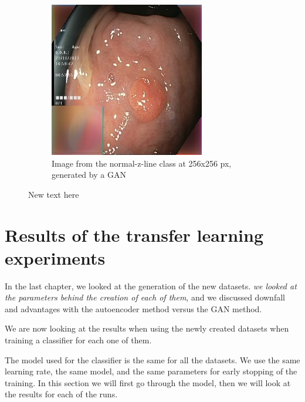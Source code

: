 \begin{figure}[t]
\begin{subfigure}[b]{0.4\textwidth}
            \includegraphics[width=\textwidth]{experiments/figures/both/greenGAN.jpg}
            \caption[]%
            {{\small Image from the normal-z-line class at 256x256 px, generated by a GAN }}    
            \label{fig:zGAN}
        \end{subfigure}
        \caption[ ]
        {\small New text here} 
        \label{fig:GC1GREEN}
    \end{figure}
    

   
\FloatBarrier

\section{Results of the transfer learning experiments}
In the last chapter, we looked at the generation of the new datasets. \textit{we looked at the parameters behind the creation of each of them}, and we discussed downfall and advantages with the autoencoder method versus the GAN method. 

We are now looking at the results when using the newly created datasets when training a classifier for each one of them. 


The model used for the classifier is the same for all the datasets. We use the same learning rate, the same model, and the same parameters for early stopping of the training.  In this section we will first go through the model, then we will look at the results for each of the runs.

